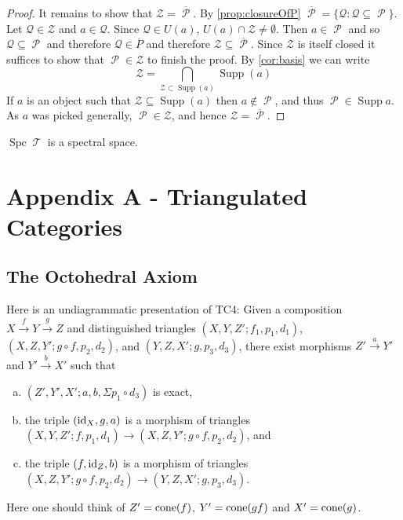 \documentclass[11pt]{article}
\DeclareMathOperator{\TT}{\mathcal{T}}
\DeclareMathOperator{\cP}{\mathcal{P}}
\DeclareMathOperator{\supp}{Supp}
\DeclareMathOperator{\spc}{Spc}
\begin{document}
\begin{proof}
It remains to show that $\mathcal{Z} = \overline{\cP}$. By \autoref{prop:closureOfP} $\overline{\cP} = \{\mathcal{Q}: \mathcal{Q} \subseteq \cP\}$. Let $\mathcal{Q} \in \mathcal{Z}$ and $a \in \mathcal{Q}$. Since $\mathcal{Q} \in U(a)$, $U(a) \cap \mathcal{Z} \not = \emptyset$. Then $a \in \cP$ and so $\mathcal{Q} \subseteq \cP$ and therefore $\mathcal{Q}\in \overline{P}$ and therefore $\mathcal{Z} \subseteq \overline{\cP}$. Since $\mathcal{Z}$ is itself closed it suffices to show that $\cP \in \mathcal{Z}$ to finish the proof. By \autoref{cor:basis} we can write
\[
	\mathcal{Z} = \bigcap_{\mathcal{Z} \subset \supp(a)}\supp(a)
\]
If $a$ is an object such that $\mathcal{Z} \subseteq \supp(a)$ then $a \not\in \cP$, and thus $\cP \in \supp a$. As $a$ was picked generally, $\cP \in \mathcal{Z}$, and hence $\mathcal{Z} = \overline{\cP}$. 
\end{proof}

\begin{cor}
$\spc\TT$ is a spectral space.
\end{cor}




\newpage

\section{Appendix A - Triangulated Categories}
\subsection{The Octohedral Axiom}\label{octaxiom}
Here is an undiagrammatic presentation of TC4: Given a composition $X \xrightarrow{f} Y \xrightarrow{g} Z$ and distinguished triangles $(X,Y,Z'; f_1, p_1, d_1)$, $(X,Z,Y'; g\circ f, p_2, d_2)$, and $(Y,Z,X'; g, p_3, d_3)$, there exist morphisms $Z' \xrightarrow{a} Y'$ and $Y' \xrightarrow{b} X'$ such that
	\begin{enumerate}[(a)]
		\item $(Z',Y',X'; a,b,\Sigma p_1 \circ d_3)$ is exact,
		\item the triple $(\operatorname{id}_X,g,a)$ is a morphism of triangles $(X,Y,Z'; f,p_1,d_1) \to (X,Z,Y'; g\circ f,p_2,d_2)$, and
		\item the triple $(f,\operatorname{id}_Z,b)$ is a morphism of triangles $(X,Z,Y'; g\circ f, p_2, d_2) \to (Y,Z,X'; g, p_3, d_3)$.
	\end{enumerate}
	Here one should think of $Z' = \operatorname{cone}(f)$, $Y' = \operatorname{cone}(gf)$ and $X' = \operatorname{cone}(g)$.
\end{document}
